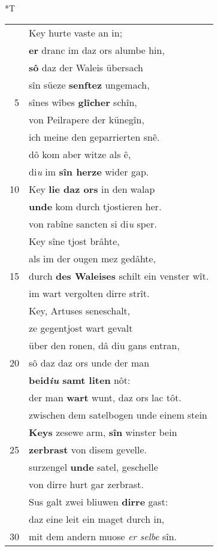 \documentclass[8pt,a4paper,notitlepage]{article}
\begin{document}
\begin{table}[ht]
\begin{minipage}[t]{0.5\linewidth}
\small
\begin{center}*T
\end{center}
\begin{tabular}{rl}
 & Key hurte vaste an in;\\ 
 & \textbf{er} dranc im daz ors alumbe hin,\\ 
 & \textbf{sô} daz der Waleis übersach\\ 
 & sîn süeze \textbf{senftez} ungemach,\\ 
5 & sînes wîbes \textbf{glîcher} schîn,\\ 
 & von Peilrapere der künegîn,\\ 
 & ich meine den geparrierten snê.\\ 
 & dô kom aber witze als ê,\\ 
 & di\textit{u} im \textbf{sîn herze} wider gap.\\ 
10 & Key \textbf{lie daz ors} in den walap\\ 
 & \textbf{unde} kom durch tjostieren her.\\ 
 & von rabîne sancten si di\textit{u} sper.\\ 
 & Key sîne tjost brâhte,\\ 
 & als im der ougen mez gedâhte,\\ 
15 & durch \textbf{des Waleises} schilt ein venster wît.\\ 
 & im wart vergolten dirre strît.\\ 
 & Key, Artuses seneschalt,\\ 
 & ze gegentjost wart gevalt\\ 
 & über den ronen, dâ diu gans entran,\\ 
20 & sô daz daz ors unde der man\\ 
 & \textbf{beid\textit{iu} samt liten} nôt:\\ 
 & der man \textbf{wart} wunt, daz ors lac tôt.\\ 
 & zwischen dem satelbogen unde einem stein\\ 
 & \textbf{Keys} zesewe arm, \textbf{sîn} winster bein\\ 
25 & \textbf{zerbrast} von disem gevelle.\\ 
 & surzengel \textbf{unde} satel, geschelle\\ 
 & von dirre hurt gar zerbrast.\\ 
 & Sus galt zwei bliuwen \textbf{dirre} gast:\\ 
 & daz eine leit ein maget durch in,\\ 
30 & mit dem andern muose \textit{er selbe} sîn.\\ 

\end{tabular}
\end{minipage}
\end{table}
\end{document}
